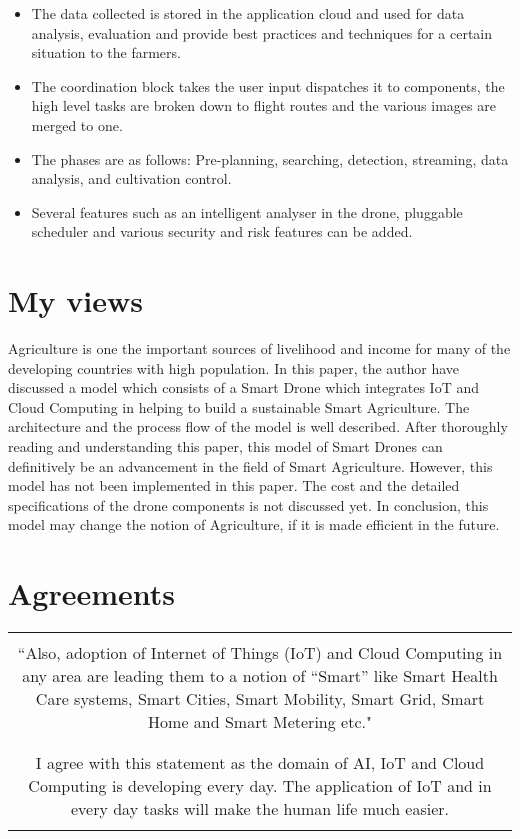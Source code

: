 \documentclass{article}
\begin{document}
\begin{itemize}
    \item The data collected is stored in the application cloud and used for data analysis, evaluation and provide best practices and techniques for a certain situation to the farmers.
    \item The coordination block takes the user input dispatches it to components, the high level tasks are broken down to flight routes and the various images are merged to one.
    \item The phases are as follows: Pre-planning, searching, detection, streaming, data analysis, and cultivation control.
    \item Several features such as an intelligent analyser in the drone, pluggable scheduler and various security and risk features can be added.
\end{itemize}
\section{My views}
Agriculture is one the important sources of livelihood and income for many of the developing countries with high population. In this paper, the author have discussed a model which consists of a Smart Drone which integrates IoT and Cloud Computing in helping to build a sustainable Smart Agriculture. The architecture and the process flow of the model is well described. After thoroughly reading and understanding this paper, this model of Smart Drones can definitively be an advancement in the field of Smart Agriculture. However, this model has not been implemented in this paper. The cost and the detailed specifications of the drone components is not discussed yet. In conclusion, this model may change the notion of Agriculture, if it is made efficient in the future.
\section{Agreements}
\begin{center}
\begin{tabular}{|c|} 
 \hline
 \\
 \multirow{4}{28em}{“Also, adoption of Internet of Things (IoT) and Cloud Computing in any area are leading them to a notion of “Smart” like Smart Health Care systems, Smart Cities, Smart Mobility, Smart Grid, Smart Home and Smart Metering etc."} \\
 \\
 \\
 \\
 \\
 \hline
 \\
 \multirow{3}{28em}{I agree with this statement as the domain of AI, IoT and Cloud Computing is developing every day. The application of IoT and in every day tasks will make the human life much easier.} \\
 \\ 
 \\
 \\
 \hline
\end{tabular}
\end{center}
\end{document}
